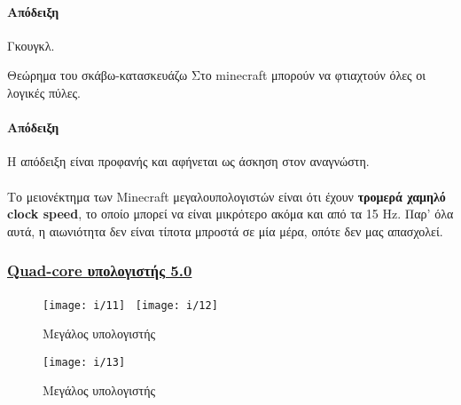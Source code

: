 \documentclass[11pt,a4paper,notitlepage,fleqn]{article}
\begin{document}
\paragraph{Απόδειξη} Γκουγκλ. \qedsymbol

\begin{theorem}{Θεώρημα του σκάβω-κατασκευάζω}{}
	Στο minecraft μπορούν να φτιαχτούν όλες οι λογικές πύλες.
\end{theorem}
\paragraph{Απόδειξη} Η απόδειξη είναι προφανής και αφήνεται ως άσκηση στον αναγνώστη. \qedsymbol

\paragraph{}
Το μειονέκτημα των Minecraft μεγαλουπολογιστών είναι ότι έχουν \textbf{τρομερά χαμηλό clock speed}, το οποίο μπορεί να είναι μικρότερο ακόμα και από τα 15 Hz. Παρ' όλα αυτά, η αιωνιότητα δεν είναι τίποτα μπροστά σε μία μέρα, οπότε δεν μας απασχολεί.

\subsubsection{\href{https://www.youtube.com/watch?v=SbO0tqH8f5I}{Quad-core υπολογιστής 5.0}}

\begin{figure}[h]
	\centering
	\texttt{[image: i/11]}~
	\texttt{[image: i/12]}
	\caption{Μεγάλος υπολογιστής}
	\label{fig:11}
\end{figure}
\begin{figure}[h]
	\centering
	\caption{Μεγάλος υπολογιστής}
	\label{fig:13}
	\texttt{[image: i/13]}
\end{figure}
\end{document}
